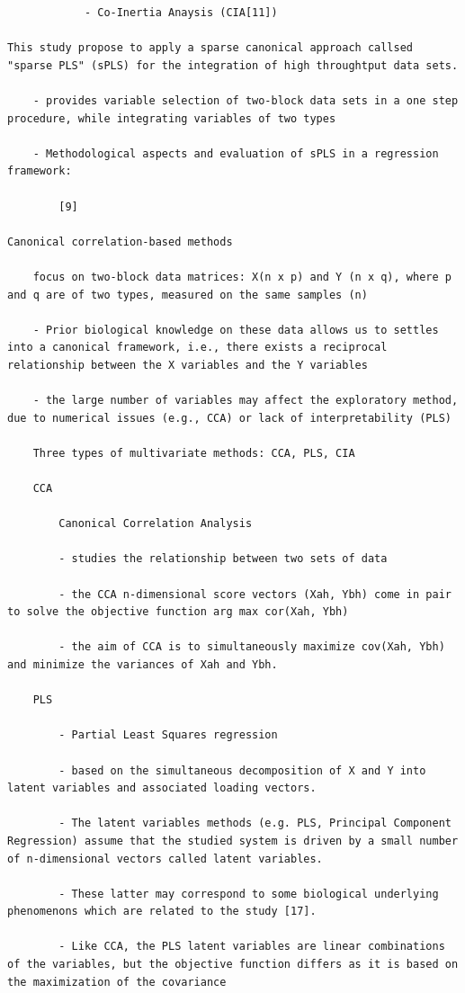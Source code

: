 \documentclass[
]{book}
\begin{document}
\begin{verbatim}
            - Co-Inertia Anaysis (CIA[11])

This study propose to apply a sparse canonical approach callsed "sparse PLS" (sPLS) for the integration of high throughtput data sets.

    - provides variable selection of two-block data sets in a one step procedure, while integrating variables of two types

    - Methodological aspects and evaluation of sPLS in a regression framework:

        [9]

Canonical correlation-based methods

    focus on two-block data matrices: X(n x p) and Y (n x q), where p and q are of two types, measured on the same samples (n)

    - Prior biological knowledge on these data allows us to settles into a canonical framework, i.e., there exists a reciprocal relationship between the X variables and the Y variables

    - the large number of variables may affect the exploratory method, due to numerical issues (e.g., CCA) or lack of interpretability (PLS)

    Three types of multivariate methods: CCA, PLS, CIA

    CCA

        Canonical Correlation Analysis

        - studies the relationship between two sets of data

        - the CCA n-dimensional score vectors (Xah, Ybh) come in pair to solve the objective function arg max cor(Xah, Ybh)

        - the aim of CCA is to simultaneously maximize cov(Xah, Ybh) and minimize the variances of Xah and Ybh.

    PLS

        - Partial Least Squares regression

        - based on the simultaneous decomposition of X and Y into latent variables and associated loading vectors.

        - The latent variables methods (e.g. PLS, Principal Component Regression) assume that the studied system is driven by a small number of n-dimensional vectors called latent variables.

        - These latter may correspond to some biological underlying phenomenons which are related to the study [17].

        - Like CCA, the PLS latent variables are linear combinations of the variables, but the objective function differs as it is based on the maximization of the covariance


\end{verbatim}
\end{document}

